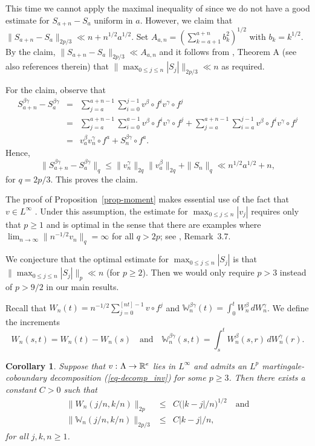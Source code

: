 \documentclass[aop,MSNbibl,seceqn,dvips]{arximspdf}
\newcommand{\eqref}[1]{(\ref{#1})}
\newtheorem{cor}[thmm]{Corollary}
\newcommand{\R}{\mathbb{R}}
\newcommand{\BBW}{\mathbb{W}}
\begin{document}
\begin{pf}
This time we cannot apply the maximal inequality of \cite{Serfling70}
since we do not have a good estimate for $S_{a+n}-S_a$ uniform in $a$.
However, we claim that $\|S_{a+n}-S_a\|_{2p/3}\ll
n+n^{1/2}a^{1/2}$. Set
$A_{a,n}=(\sum_{k=a+1}^{a+n}b_k^2)^{1/2}$ with $b_k=k^{1/2}$.
By the claim,
$\|S_{a+n}-S_a\|_{2p/3}\ll
A_{a,n}$ and it follows from \cite{Moricz76}, Theorem A (see also
references therein) that
$\|\max_{0\le j\le n}|S_j| \|_{2p/3}\ll n$ as required.

For the claim, observe that
%
\begin{eqnarray*}
S^{\beta\gamma}_{a+n}-S^{\beta\gamma}_a & =&\sum
_{j=a}^{a+n-1}\sum_{i=0}^{j-1}v^\beta
\circ f^i v^\gamma\circ f^j
\\
& =&\sum_{j=a}^{a+n-1}\sum
_{i=0}^{a-1}v^\beta\circ f^i
v^\gamma \circ f^j +\sum_{j=a}^{a+n-1}
\sum_{i=a}^{j-1}v^\beta\circ
f^i v^\gamma\circ f^j
\\
& =&v_a^\beta v_n^\gamma\circ
f^a+S_n^{\beta\gamma}\circ f^a.
\end{eqnarray*}
%
Hence,
%
\[
\bigl\|S^{\beta\gamma}_{a+n}-S^{\beta\gamma}_a
\bigr\|_q\le\bigl\|v_n^\gamma\bigr\| _{2q}\bigl\|
v_a^\beta\bigr\|_{2q}+\|S_n
\|_q \ll n^{1/2}a^{1/2}+n,
\]
%
for $q=2p/3$. This proves the claim.
\end{pf}

\begin{rmk}
The proof of Proposition~\ref{prop-moment} makes essential use of the
fact that $v\in L^\infty$ \cite{LesigneVolny01,MN08,MTorok12}. Under
this assumption,
the estimate for $\max_{0\le j\le n}|v_j|$ requires only that $p\ge1$
and is optimal in the sense that there are examples where $\lim_{n\to
\infty}\|n^{-1/2}v_n\|_q=\infty$ for all $q>2p$; see \cite{MTorok12},
Remark~3.7.

We conjecture that the optimal estimate for $\max_{0\le j\le n}|S_j|$
is that\break
$\|\max_{0\le j\le n}|S_j| \|_p\ll n$ (for $p\ge2$).
Then we would only require $p>3$ instead of $p>9/2$ in our main results.
\end{rmk}

Recall that
$W_n(t)=n^{-1/2}\sum_{j=0}^{[nt]-1}v\circ f^j$ and
$\BBW_n^{\beta\gamma}(t)=\int_0^t W_n^\beta \,dW_n^\gamma$.
We define the increments
%
\[
W_n(s,t)=W_n(t)-W_n(s) \quad\mbox{and}\quad
\BBW^{\beta\gamma
}_n(s,t)=\int_s^t
W^\beta_n(s,r) \,dW^\gamma_n(r).
\]

\begin{cor} \label{cor-moment}
Suppose that $v\dvtx\Lambda\to\R^e$ lies in $L^\infty$ and admits
an $L^p$
martingale-coboundary decomposition \eqref{eq-decomp_inv} for some
$p\ge3$.
Then there exists a constant $C>0$ such that
%
\begin{eqnarray*}
\bigl\|W_n(j/n,k/n)\bigr\|_{2p} &\leq& C\bigl(|k-j|/n\bigr)^{1/2}\quad
\mbox{and}\\
 \bigl\|\BBW _n(j/n,k/n) \bigr\|_{2p/3} &\leq& C|k-j|/n,
\end{eqnarray*}
%
for all $j,k,n\ge1$.
\end{cor}
\end{document}
